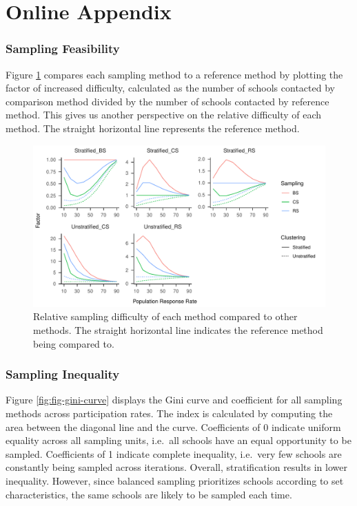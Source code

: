 \documentclass[english,man,floatsintext]{apa6}
\begin{document}
\hypertarget{online-appendix}{%
\section{Online Appendix}\label{online-appendix}}

\hypertarget{sampling-feasibility}{%
\subsubsection{Sampling Feasibility}\label{sampling-feasibility}}

Figure \ref{fig:fig-rel-per} compares each sampling method to a reference method by plotting the factor of increased difficulty, calculated as the number of schools contacted by comparison method divided by the number of schools contacted by reference method. This gives us another perspective on the relative difficulty of each method. The straight horizontal line represents the reference method.



\begin{figure}
\centering
\includegraphics{6---Paper_files/figure-latex/fig-rel-per-1.pdf}
\caption{\label{fig:fig-rel-per}Relative sampling difficulty of each method compared to other methods. The straight horizontal line indicates the reference method being compared to.}
\end{figure}

\hypertarget{sampling-inequality-2}{%
\subsubsection{Sampling Inequality}\label{sampling-inequality-2}}

Figure \ref{fig:fig-gini-curve} displays the Gini curve and coefficient for all sampling methods across participation rates. The index is calculated by computing the area between the diagonal line and the curve. Coefficients of 0 indicate uniform equality across all sampling units, i.e.~all schools have an equal opportunity to be sampled. Coefficients of 1 indicate complete inequality, i.e.~very few schools are constantly being sampled across iterations. Overall, stratification results in lower inequality. However, since balanced sampling prioritizes schools according to set characteristics, the same schools are likely to be sampled each time.
\end{document}

